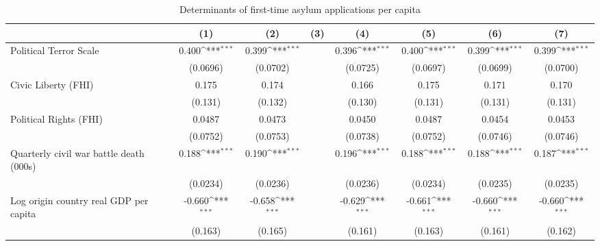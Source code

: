 \begin{table}[htbp]\centering
\def\sym#1{\ifmmode^{#1}\else\(^{#1}\)\fi}
\caption{Determinants of first-time asylum applications per capita}
\begin{tabular}{l*{7}{c}}
\hline\hline
                    &\multicolumn{1}{c}{(1)}         &\multicolumn{1}{c}{(2)}         &\multicolumn{1}{c}{(3)}         &\multicolumn{1}{c}{(4)}         &\multicolumn{1}{c}{(5)}         &\multicolumn{1}{c}{(6)}         &\multicolumn{1}{c}{(7)}         \\
\hline
Political Terror Scale&       0.400\sym{***}&       0.399\sym{***}&                     &       0.396\sym{***}&       0.400\sym{***}&       0.399\sym{***}&       0.399\sym{***}\\
                    &    (0.0696)         &    (0.0702)         &                     &    (0.0725)         &    (0.0697)         &    (0.0699)         &    (0.0700)         \\
[1em]
Civic Liberty (FHI) &       0.175         &       0.174         &                     &       0.166         &       0.175         &       0.171         &       0.170         \\
                    &     (0.131)         &     (0.132)         &                     &     (0.130)         &     (0.131)         &     (0.131)         &     (0.131)         \\
[1em]
Political Rights (FHI)&      0.0487         &      0.0473         &                     &      0.0450         &      0.0487         &      0.0454         &      0.0453         \\
                    &    (0.0752)         &    (0.0753)         &                     &    (0.0738)         &    (0.0752)         &    (0.0746)         &    (0.0746)         \\
[1em]
Quarterly civil war battle death (000s)&       0.188\sym{***}&       0.190\sym{***}&                     &       0.196\sym{***}&       0.188\sym{***}&       0.188\sym{***}&       0.187\sym{***}\\
                    &    (0.0234)         &    (0.0236)         &                     &    (0.0236)         &    (0.0234)         &    (0.0235)         &    (0.0235)         \\
[1em]
Log origin country real GDP per capita&      -0.660\sym{***}&      -0.658\sym{***}&                     &      -0.629\sym{***}&      -0.661\sym{***}&      -0.660\sym{***}&      -0.660\sym{***}\\
                    &     (0.163)         &     (0.165)         &                     &     (0.161)         &     (0.163)         &     (0.161)         &     (0.162)         \\

\end{tabular}
\end{table}
